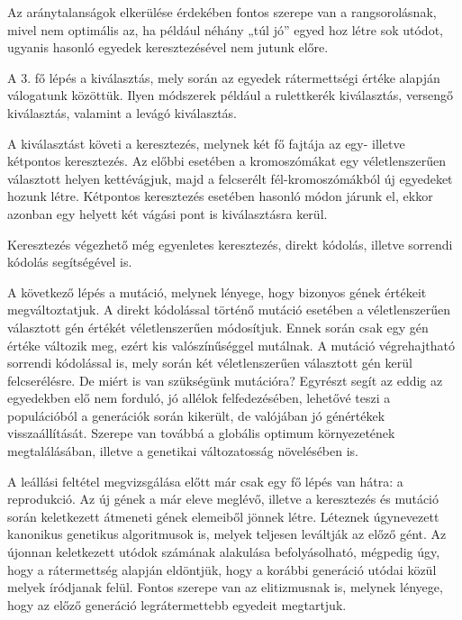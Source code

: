 \documentclass[12pt,a4paper,oneside]{report}
\begin{document}
Az aránytalanságok elkerülése érdekében fontos szerepe van a rangsorolásnak, mivel nem optimális az, ha például néhány „túl jó” egyed hoz létre sok utódot, ugyanis hasonló egyedek keresztezésével nem jutunk előre.

A 3. fő lépés a kiválasztás, mely során az egyedek rátermettségi értéke alapján válogatunk közöttük. Ilyen módszerek például a rulettkerék kiválasztás, versengő kiválasztás, valamint a levágó kiválasztás.

A kiválasztást követi a keresztezés, melynek két fő fajtája az egy- illetve kétpontos keresztezés. Az előbbi esetében a kromoszómákat egy véletlenszerűen választott helyen kettévágjuk, majd a felcserélt fél-kromoszómákból új egyedeket hozunk létre. Kétpontos keresztezés esetében hasonló módon járunk el, ekkor azonban egy helyett két vágási pont is kiválasztásra kerül.



Keresztezés végezhető még egyenletes keresztezés, direkt kódolás, illetve sorrendi kódolás segítségével is.

A következő lépés a mutáció, melynek lényege, hogy bizonyos gének értékeit megváltoztatjuk. A direkt kódolással történő mutáció esetében a véletlenszerűen választott gén értékét véletlenszerűen módosítjuk. Ennek során csak egy gén értéke változik meg, ezért kis valószínűséggel mutálnak. A mutáció végrehajtható sorrendi kódolással is, mely során két véletlenszerűen választott gén kerül felcserélésre. De miért is van szükségünk mutációra? Egyrészt segít az eddig az egyedekben elő nem forduló, jó allélok felfedezésében, lehetővé teszi a populációból a generációk során kikerült, de valójában jó génértékek visszaállítását. Szerepe van továbbá a globális optimum környezetének megtalálásában, illetve a genetikai változatosság növelésében is.

A leállási feltétel megvizsgálása előtt már csak egy fő lépés van hátra: a reprodukció. Az új gének a már eleve meglévő, illetve a keresztezés és mutáció során keletkezett átmeneti gének elemeiből jönnek létre. Léteznek úgynevezett kanonikus genetikus algoritmusok is, melyek teljesen leváltják az előző gént. Az újonnan keletkezett utódok számának alakulása befolyásolható, mégpedig úgy, hogy a rátermettség alapján eldöntjük, hogy a korábbi generáció utódai közül melyek íródjanak felül. Fontos szerepe van az elitizmusnak is, melynek lényege, hogy az előző generáció legrátermettebb egyedeit megtartjuk.
\end{document}

